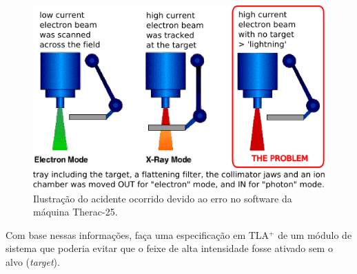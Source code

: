 \begin{figure}\centering
\includegraphics[scale=.4]{therac25.png}
\caption{Ilustração do acidente ocorrido devido ao erro no software da máquina Therac-25.}
\label{fig:therac}
\end{figure}

Com base nessas informações, faça uma especificação em TLA$^+$ de um
módulo de sistema que poderia evitar que o feixe de alta intensidade
fosse ativado sem o alvo ({\em target}).